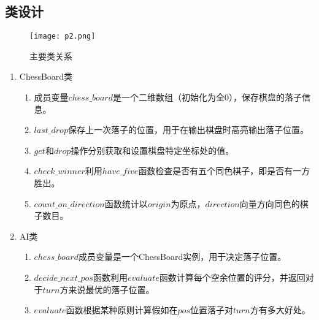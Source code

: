 \documentclass[UTF8,a4paper,12pt]{article}
\begin{document}
\subsection{类设计}
\begin{figure}[h]
\begin{center}
\texttt{[image: p2.png]} %
\caption{主要类关系}
\end{center}
\end{figure}
\begin{enumerate}[itemindent=0.5em,label=\arabic*、]
  \item ChessBoard类
  \begin{enumerate}[itemindent=0.5em,label=(\arabic*)]
    \item 成员变量$chess\_board$是一个二维数组（初始化为全0），保存棋盘的落子信息。
    \item $last\_drop$保存上一次落子的位置，用于在输出棋盘时高亮输出落子位置。
    \item $get$和$drop$操作分别获取和设置棋盘特定坐标处的值。
    \item $check\_winner$利用$have\_five$函数检查是否有五个同色棋子，即是否有一方胜出。
    \item $count\_on\_direction$函数统计以$origin$为原点，$direction$向量方向同色的棋子数目。
  \end{enumerate}
  \item AI类
  \begin{enumerate}[itemindent=0.5em,label=(\arabic*)]
    \item $chess\_board$成员变量是一个ChessBoard实例，用于决定落子位置。
    \item $decide\_next\_pos$函数利用$evaluate$函数计算每个空余位置的评分，并返回对于$turn$方来说最优的落子位置。
    \item $evaluate$函数根据某种原则计算假如在$pos$位置落子对$turn$方有多大好处。
  \end{enumerate}
\end{enumerate}
\end{document}

